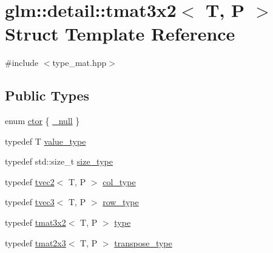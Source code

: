 \hypertarget{structglm_1_1detail_1_1tmat3x2}{}\section{glm\+:\+:detail\+:\+:tmat3x2$<$ T, P $>$ Struct Template Reference}
\label{structglm_1_1detail_1_1tmat3x2}


{\ttfamily \#include $<$type\+\_\+mat.\+hpp$>$}

\subsection*{Public Types}
\begin{DoxyCompactItemize}
\item 
enum \hyperlink{structglm_1_1detail_1_1tmat3x2_ae8783ababf4eb06fdbb048bb90ef3b03}{ctor} \{ \hyperlink{structglm_1_1detail_1_1tmat3x2_ae8783ababf4eb06fdbb048bb90ef3b03a934418ab52e241503f37c54333bb848e}{\+\_\+null}
 \}
\item 
typedef T \hyperlink{structglm_1_1detail_1_1tmat3x2_a3a0297927f3affe894622f9496b66db4}{value\+\_\+type}
\item 
typedef std\+::size\+\_\+t \hyperlink{structglm_1_1detail_1_1tmat3x2_af70231300959702a284387cd047e5802}{size\+\_\+type}
\item 
typedef \hyperlink{structglm_1_1detail_1_1tvec2}{tvec2}$<$ T, P $>$ \hyperlink{structglm_1_1detail_1_1tmat3x2_a9c0f2cfe8e359b2917b5f616a5dbc9e4}{col\+\_\+type}
\item 
typedef \hyperlink{structglm_1_1detail_1_1tvec3}{tvec3}$<$ T, P $>$ \hyperlink{structglm_1_1detail_1_1tmat3x2_a4e9b5f959b95a291c070d0f60195306f}{row\+\_\+type}
\item 
typedef \hyperlink{structglm_1_1detail_1_1tmat3x2}{tmat3x2}$<$ T, P $>$ \hyperlink{structglm_1_1detail_1_1tmat3x2_ae5d42d3fe65b97066f5a74e2da7015e3}{type}
\item 
typedef \hyperlink{structglm_1_1detail_1_1tmat2x3}{tmat2x3}$<$ T, P $>$ \hyperlink{structglm_1_1detail_1_1tmat3x2_acb1e7f53f46b54ebb6699582fa1c4b71}{transpose\+\_\+type}
\end{DoxyCompactItemize}
